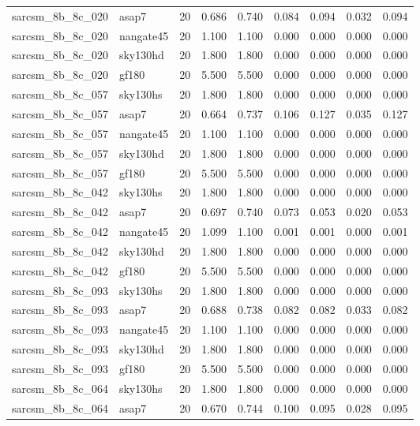 \begin{tabular}{llrrrrrrr}
sarcsm\_8b\_8c\_020 & asap7 & 20 & 0.686 & 0.740 & 0.084 & 0.094 & 0.032 & 0.094 \\
sarcsm\_8b\_8c\_020 & nangate45 & 20 & 1.100 & 1.100 & 0.000 & 0.000 & 0.000 & 0.000 \\
sarcsm\_8b\_8c\_020 & sky130hd & 20 & 1.800 & 1.800 & 0.000 & 0.000 & 0.000 & 0.000 \\
sarcsm\_8b\_8c\_020 & gf180 & 20 & 5.500 & 5.500 & 0.000 & 0.000 & 0.000 & 0.000 \\
sarcsm\_8b\_8c\_057 & sky130hs & 20 & 1.800 & 1.800 & 0.000 & 0.000 & 0.000 & 0.000 \\
sarcsm\_8b\_8c\_057 & asap7 & 20 & 0.664 & 0.737 & 0.106 & 0.127 & 0.035 & 0.127 \\
sarcsm\_8b\_8c\_057 & nangate45 & 20 & 1.100 & 1.100 & 0.000 & 0.000 & 0.000 & 0.000 \\
sarcsm\_8b\_8c\_057 & sky130hd & 20 & 1.800 & 1.800 & 0.000 & 0.000 & 0.000 & 0.000 \\
sarcsm\_8b\_8c\_057 & gf180 & 20 & 5.500 & 5.500 & 0.000 & 0.000 & 0.000 & 0.000 \\
sarcsm\_8b\_8c\_042 & sky130hs & 20 & 1.800 & 1.800 & 0.000 & 0.000 & 0.000 & 0.000 \\
sarcsm\_8b\_8c\_042 & asap7 & 20 & 0.697 & 0.740 & 0.073 & 0.053 & 0.020 & 0.053 \\
sarcsm\_8b\_8c\_042 & nangate45 & 20 & 1.099 & 1.100 & 0.001 & 0.001 & 0.000 & 0.001 \\
sarcsm\_8b\_8c\_042 & sky130hd & 20 & 1.800 & 1.800 & 0.000 & 0.000 & 0.000 & 0.000 \\
sarcsm\_8b\_8c\_042 & gf180 & 20 & 5.500 & 5.500 & 0.000 & 0.000 & 0.000 & 0.000 \\
sarcsm\_8b\_8c\_093 & sky130hs & 20 & 1.800 & 1.800 & 0.000 & 0.000 & 0.000 & 0.000 \\
sarcsm\_8b\_8c\_093 & asap7 & 20 & 0.688 & 0.738 & 0.082 & 0.082 & 0.033 & 0.082 \\
sarcsm\_8b\_8c\_093 & nangate45 & 20 & 1.100 & 1.100 & 0.000 & 0.000 & 0.000 & 0.000 \\
sarcsm\_8b\_8c\_093 & sky130hd & 20 & 1.800 & 1.800 & 0.000 & 0.000 & 0.000 & 0.000 \\
sarcsm\_8b\_8c\_093 & gf180 & 20 & 5.500 & 5.500 & 0.000 & 0.000 & 0.000 & 0.000 \\
sarcsm\_8b\_8c\_064 & sky130hs & 20 & 1.800 & 1.800 & 0.000 & 0.000 & 0.000 & 0.000 \\
sarcsm\_8b\_8c\_064 & asap7 & 20 & 0.670 & 0.744 & 0.100 & 0.095 & 0.028 & 0.095 \\

\end{tabular}
